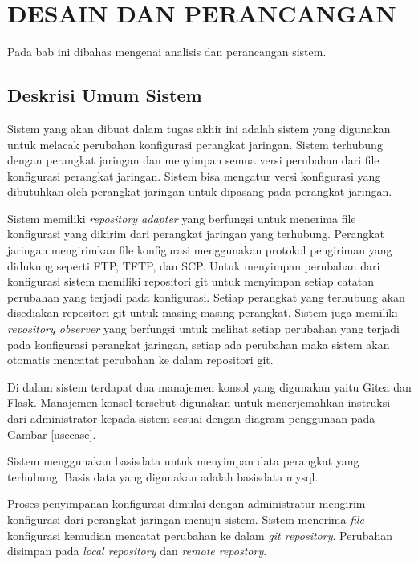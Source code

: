 \chapter{DESAIN DAN PERANCANGAN}
    Pada bab ini dibahas mengenai analisis dan perancangan sistem.
    
    \section{Deskrisi Umum Sistem}
    	Sistem yang akan dibuat dalam tugas akhir ini adalah sistem yang digunakan untuk melacak perubahan konfigurasi perangkat jaringan. Sistem terhubung dengan perangkat jaringan dan menyimpan semua versi perubahan dari file konfigurasi perangkat jaringan. Sistem bisa mengatur versi konfigurasi yang dibutuhkan oleh perangkat jaringan untuk dipasang pada perangkat jaringan.
    	
    	\indent Sistem memiliki \textit{repository adapter} yang berfungsi untuk menerima file konfigurasi yang dikirim dari perangkat jaringan yang terhubung. Perangkat jaringan mengirimkan file konfigurasi menggunakan protokol pengiriman yang didukung seperti FTP, TFTP, dan SCP. Untuk menyimpan perubahan dari konfigurasi sistem memiliki repositori git untuk menyimpan setiap catatan perubahan yang terjadi pada konfigurasi. Setiap perangkat yang terhubung akan disediakan repositori git untuk masing-masing perangkat. Sistem juga memiliki \textit{repository observer} yang berfungsi untuk melihat setiap perubahan yang terjadi pada konfigurasi perangkat jaringan, setiap ada perubahan maka sistem akan otomatis mencatat perubahan ke dalam repositori git.
    	
    	\indent Di dalam sistem terdapat dua manajemen konsol yang digunakan yaitu Gitea dan Flask. Manajemen konsol tersebut digunakan untuk menerjemahkan instruksi dari administrator kepada sistem sesuai dengan diagram penggunaan pada Gambar \ref{usecase}.
    	
    	\indent Sistem menggunakan basisdata untuk menyimpan data perangkat yang terhubung. Basis data yang digunakan adalah basisdata mysql.
    	
    	\indent Proses penyimpanan konfigurasi dimulai dengan administratur mengirim konfigurasi dari perangkat jaringan menuju sistem. Sistem menerima \textit{file} konfigurasi kemudian mencatat perubahan ke dalam \textit{git repository}. Perubahan disimpan pada \textit{local repository} dan \textit{remote repostory}.
	
